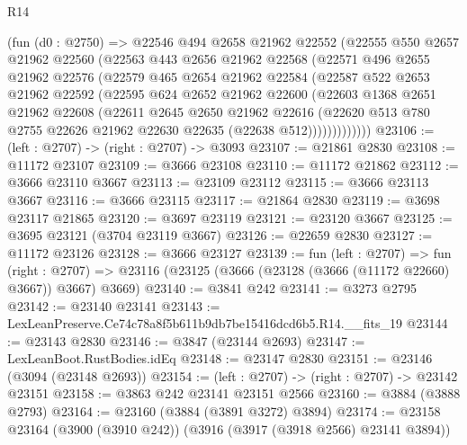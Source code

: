 \begin{lexlean}{R14}
\begin{coremodule}
        (fun (d0 : @2750) =>
        @22546
          @494
          @2658
          @21962
          @22552
          (@22555
            @550
            @2657
            @21962
            @22560
            (@22563
              @443
              @2656
              @21962
              @22568
              (@22571
                @496
                @2655
                @21962
                @22576
                (@22579
                  @465
                  @2654
                  @21962
                  @22584
                  (@22587
                    @522
                    @2653
                    @21962
                    @22592
                    (@22595
                      @624
                      @2652
                      @21962
                      @22600
                      (@22603
                        @1368
                        @2651
                        @21962
                        @22608
                        (@22611
                          @2645
                          @2650
                          @21962
                          @22616
                          (@22620
                            @513
                            @780
                            @2755
                            @22626
                            @21962
                            @22630
                            @22635
                            (@22638 @512)))))))))))))
@23106 := (left : @2707) -> (right : @2707) -> @3093
@23107 := @21861 @2830
@23108 := @11172 @23107
@23109 := @3666 @23108
@23110 := @11172 @21862
@23112 := @3666 @23110 @3667
@23113 := @23109 @23112
@23115 := @3666 @23113 @3667
@23116 := @3666 @23115
@23117 := @21864 @2830
@23119 := @3698 @23117 @21865
@23120 := @3697 @23119
@23121 := @23120 @3667
@23125 := @3695 @23121 (@3704 @23119 @3667)
@23126 := @22659 @2830
@23127 := @11172 @23126
@23128 := @3666 @23127
@23139 := fun (left : @2707) =>
  fun (right : @2707) => @23116 (@23125 (@3666 (@23128 (@3666 (@11172 @22660) @3667)) @3667) @3669)
@23140 := @3841 @242
@23141 := @3273 @2795
@23142 := @23140 @23141
@23143 := LexLeanPreserve.Ce74c78a8f5b611b9db7be15416dcd6b5.R14.__fits_19
@23144 := @23143 @2830
@23146 := @3847 (@23144 @2693)
@23147 := LexLeanBoot.RustBodies.idEq
@23148 := @23147 @2830
@23151 := @23146 (@3094 (@23148 @2693))
@23154 := (left : @2707) -> (right : @2707) -> @23142 @23151
@23158 := @3863 @242 @23141 @23151 @2566
@23160 := @3884 (@3888 @2793)
@23164 := @23160 (@3884 (@3891 @3272) @3894)
@23174 := @23158 @23164 (@3900 (@3910 @242)) (@3916 (@3917 (@3918 @2566) @23141 @3894))

\end{coremodule}
\end{lexlean}
